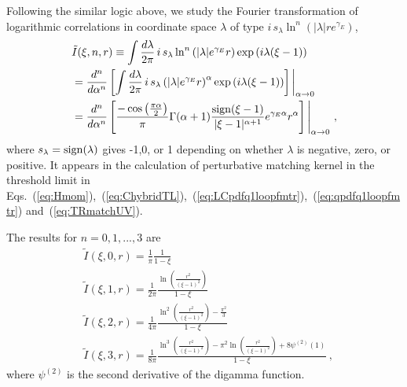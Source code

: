 \documentclass[a4paper,11pt]{article}
\begin{document}
Following the similar logic above, we study the Fourier transformation of 
logarithmic correlations in coordinate space $\lambda$ of type $i \, s_{\lambda} \ln^{n}\left(|\lambda|r e^{\gamma_E} \right)$,
\begin{align}\label{eq:FTlogodd}
&\tilde I(\xi, n,r) \equiv \int \frac{d \lambda}{2 \pi} \, i \, s_{\lambda} \ln^{n}\left(|\lambda| e^{\gamma_E} r\right) \exp \left(i \lambda (\xi-1)\right) \nonumber\\
&= \frac{d^n}{d\alpha^n} \left[ \int \frac{d \lambda}{2 \pi} \, i \, s_{\lambda} \left(|\lambda| e^{\gamma_E} r\right)^{\alpha} \exp \left(i \lambda (\xi-1)\right) \right] \bigg|_{\alpha \rightarrow 0} \nonumber\\
&= \frac{d^n}{d\alpha^n} \left[ \frac{-\cos\left(\frac{\pi \alpha}{2}\right)}{\pi} \Gamma (\alpha +1) \frac{{\rm sign}(\xi-1)}{|\xi-1|^{\alpha+1}} e^{\gamma_E  \alpha } r^{\alpha } \right] \Bigg|_{\alpha \rightarrow 0} \  ,
\end{align}
where $s_{\lambda} = {\rm sign}(\lambda) $ gives -1,0, or 1 depending on whether $\lambda$ is negative, zero, or positive. It appears in the calculation of perturbative matching kernel in the threshold limit in Eqs.~(\ref{eq:Hmom}),~(\ref{eq:ChybridTL}),~(\ref{eq:LCpdfq1loopfmtr}),~(\ref{eq:qpdfq1loopfmtr}) and~(\ref{eq:TRmatchUV}). 

The results for $n=0,1,...,3$ are
\begin{align}\label{eq:FTodd}
&\tilde I(\xi, 0,r) = \frac{1}{\pi}\frac{1}{1 -\xi} \nonumber\\
&\tilde I(\xi, 1,r) = \frac{1}{2\pi} \frac{\ln \left(\frac{r^2}{(\xi -1)^2}\right)}{1 - \xi } \nonumber\\
&\tilde I(\xi, 2,r) = \frac{1}{4\pi}\frac{ \ln ^2\left(\frac{r^2}{(\xi -1)^2}\right) - \frac{\pi^2}{3} }{1-\xi}  \nonumber\\
&\tilde I(\xi, 3,r) =  \frac{1}{8 \pi}\frac{\ln ^3\left(\frac{r^2}{(\xi -1)^2}\right)-\pi ^2 \ln \left(\frac{r^2}{(\xi
   -1)^2}\right)+8 \psi ^{(2)}(1)}{1-\xi} \ ,
\end{align}
where $\psi^{(2)}$ is the second derivative of the digamma function. 
\end{document}
